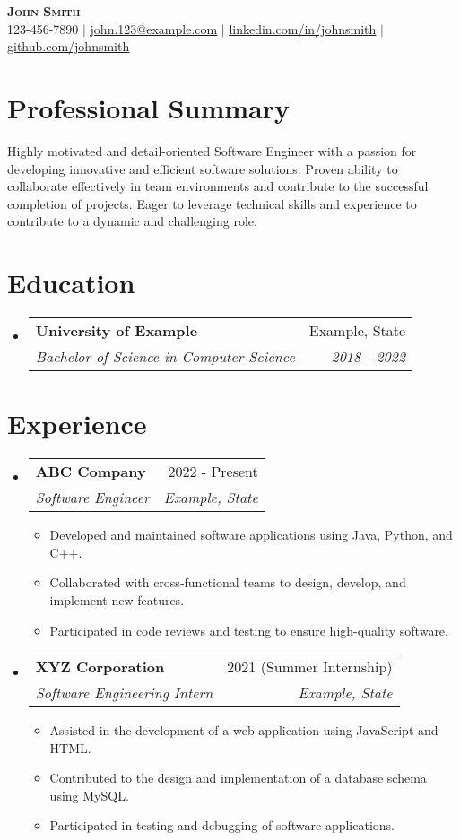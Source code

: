 \documentclass[letterpaper,11pt]{article}
\makeatletter
\newcommand{\resumeItem}[1]{
\item\small{
{#1 \vspace{-2pt}}
}
}
\newcommand{\resumeSubheading}[4]{
\vspace{-2pt}\item
\begin{tabular*}{0.97\textwidth}[t]{l@{\extracolsep{\fill}}r}
\textbf{#1} & #2 \\
\textit{\small#3} & \textit{\small #4} \\
\end{tabular*}\vspace{-7pt}
}
\newcommand{\resumeSubHeadingListStart}{\begin{itemize}[leftmargin=0.15in, label={}]}
\newcommand{\resumeSubHeadingListEnd}{\end{itemize}}
\newcommand{\resumeItemListStart}{\begin{itemize}}
\newcommand{\resumeItemListEnd}{\end{itemize}\vspace{-5pt}}
\makeatother
\begin{document}
\begin{center}
\textbf{\Huge \scshape John Smith} \\ \vspace{1pt}
\small 123-456-7890 $|$ \href{mailto:john.123@example.com}{\underline{john.123@example.com}} $|$
\href{https://linkedin.com/in/johnsmith}{\underline{linkedin.com/in/johnsmith}} $|$
\href{https://github.com/johnsmith}{\underline{github.com/johnsmith}}
\end{center}


\section{Professional Summary} %
Highly motivated and detail-oriented Software Engineer with a passion for developing innovative and efficient software solutions. Proven ability to collaborate effectively in team environments and contribute to the successful completion of projects. Eager to leverage technical skills and experience to contribute to a dynamic and challenging role.

\section{Education}
\resumeSubHeadingListStart
\resumeSubheading{University of Example}{Example, State}{Bachelor of Science in Computer Science}{2018 - 2022}
\resumeSubHeadingListEnd

\section{Experience}
\resumeSubHeadingListStart
\resumeSubheading{ABC Company}{2022 - Present}{Software Engineer}{Example, State}
\resumeItemListStart
\resumeItem{Developed and maintained software applications using Java, Python, and C++.}
\resumeItem{Collaborated with cross-functional teams to design, develop, and implement new features.}
\resumeItem{Participated in code reviews and testing to ensure high-quality software.}
\resumeItemListEnd

\resumeSubheading{XYZ Corporation}{2021 (Summer Internship)}{Software Engineering Intern}{Example, State}
\resumeItemListStart
\resumeItem{Assisted in the development of a web application using JavaScript and HTML.}
\resumeItem{Contributed to the design and implementation of a database schema using MySQL.}
\resumeItem{Participated in testing and debugging of software applications.}
\resumeItemListEnd
\resumeSubHeadingListEnd
\end{document}
